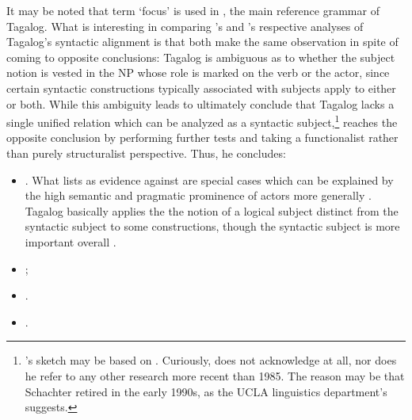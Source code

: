It may be noted that term `focus' is used in \citet{schachterotanes1972}, the
main reference grammar of Tagalog. What is interesting in comparing
\citet{schachter2015}'s and \citet{kroeger1991}'s respective analyses of
Tagalog's syntactic alignment is that both make the same observation in spite
of coming to opposite conclusions: Tagalog is ambiguous as to whether the
subject notion is vested in the NP whose role is marked on the verb or the
actor, since certain syntactic constructions typically associated with subjects
apply to either or both. While this ambiguity leads
\textcites{schachter1976}{schachter2015} to ultimately conclude that Tagalog
lacks a single unified relation which can be analyzed as a syntactic
subject,\footnote{\citet{cowan1995}'s sketch may be based on
\citet{schachter1976}. Curiously, \citet{schachter2015} does not acknowledge
\citet{kroeger1991} at all, nor does he refer to any other research more recent
than 1985. The reason may be that Schachter retired in the early 1990s, as the
UCLA linguistics department's \citet{uclalingdepthist} suggests.}
\citet{kroeger1991} reaches the opposite conclusion by performing further tests
and taking a functionalist rather than purely structuralist perspective. Thus,
he concludes:

\begin{itemize}
	\item {}. What \citet{schachter1976} lists as evidence against are
		special cases which can be explained by the high semantic and pragmatic
		prominence of actors more generally \citep[225]{kroeger1991}. Tagalog
		basically applies the the notion of a logical subject distinct from the
		syntactic subject to some constructions, though the syntactic subject
		is more important overall \citep[36]{kroeger1991}.
	\item {};
	\item {}.
	\item {}.
\end{itemize}

